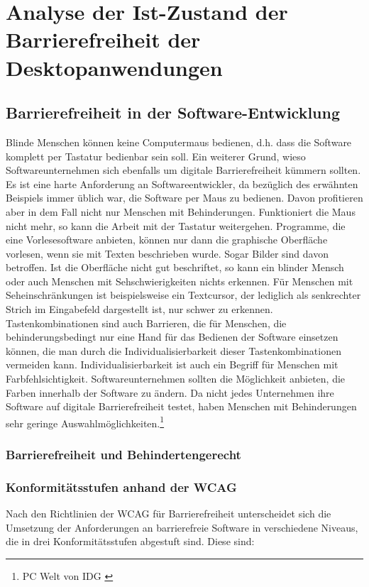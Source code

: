 \section{Analyse der Ist-Zustand der Barrierefreiheit der Desktopanwendungen}

\subsection{Barrierefreiheit in der Software-Entwicklung}
Blinde Menschen können keine Computermaus bedienen, d.h. dass die Software komplett per Tastatur bedienbar sein soll. Ein weiterer Grund, wieso Softwareunternehmen sich ebenfalls um digitale Barrierefreiheit kümmern sollten. Es ist eine harte Anforderung an Softwareentwickler, da bezüglich des erwähnten Beispiels immer üblich war, die Software per Maus zu bedienen. Davon profitieren aber in dem Fall nicht nur Menschen mit Behinderungen. Funktioniert die Maus nicht mehr, so kann die Arbeit mit der Tastatur weitergehen. Programme, die eine Vorlesesoftware anbieten, können nur dann die graphische Oberfläche vorlesen, wenn sie mit Texten beschrieben wurde. Sogar Bilder sind davon betroffen. Ist die Oberfläche nicht gut beschriftet, so kann ein blinder Mensch oder auch Menschen mit Sehschwierigkeiten nichts erkennen. Für Menschen mit Seheinschränkungen ist beispielsweise ein Textcursor, der lediglich als senkrechter Strich im Eingabefeld dargestellt ist, nur schwer zu erkennen. Tastenkombinationen sind auch Barrieren, die für Menschen, die behinderungsbedingt nur eine Hand für das Bedienen der Software einsetzen können, die man durch die Individualisierbarkeit dieser Tastenkombinationen vermeiden kann. Individualisierbarkeit ist auch ein Begriff für Menschen mit Farbfehlsichtigkeit. Softwareunternehmen sollten die Möglichkeit anbieten, die Farben innerhalb der Software zu ändern. Da nicht jedes Unternehmen ihre Software auf digitale Barrierefreiheit testet, haben Menschen mit Behinderungen sehr geringe Auswahlmöglichkeiten.\footnote{PC Welt von IDG \cite{PcWelt}}

\subsubsection{Barrierefreiheit und Behindertengerecht}
\label{subsec:Barrierefreiheit und Behindertengerecht}


\subsubsection{Konformitätsstufen anhand der \ac{WCAG}}
\label{subsubsec: Konformitätsstufen}
Nach den Richtlinien der \ac{WCAG} für Barrierefreiheit unterscheidet sich die Umsetzung der Anforderungen an barrierefreie Software in verschiedene Niveaus, die in drei Konformitätsstufen abgestuft sind. Diese sind:


